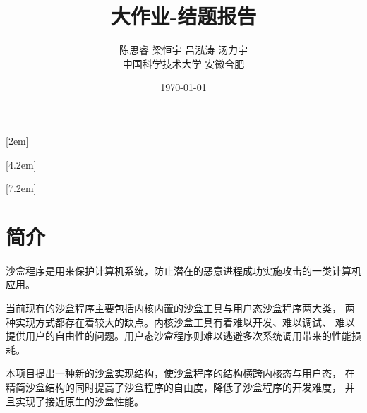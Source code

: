\documentclass[AutoFakeBold,a4paper]{ctexart}
\begin{document}
\title{\textbf{\Huge 大作业-结题报告}}

\author{陈思睿 \quad 梁恒宇 \quad 吕泓涛 \quad 汤力宇\\
中国科学技术大学 \quad 安徽合肥}

\date{\today}

\maketitle


[2em]{\addvspace{1.3mm}\bf}{%
\contentslabel{2.0em}}{}{\titlerule*[5pt]{$\cdot$}\contentspage}

[4.2em]{}{\contentslabel{2.5em}}{}{%
\titlerule*[5pt]{$\cdot$}\contentspage}

[7.2em]{}{\contentslabel{3.3em}}{}{%
\titlerule*[5pt]{$\cdot$}\contentspage}

\tableofcontents

\setcounter{page}{1}




\section{简介}
沙盒程序是用来保护计算机系统，防止潜在的恶意进程成功实施攻击的一类计算机应用。

当前现有的沙盒程序主要包括内核内置的沙盒工具与用户态沙盒程序两大类，
两种实现方式都存在着较大的缺点。内核沙盒工具有着难以开发、难以调试、
难以提供用户的自由性的问题。用户态沙盒程序则难以逃避多次系统调用带来的性能损耗。

本项目提出一种新的沙盒实现结构，使沙盒程序的结构横跨内核态与用户态，
在精简沙盒结构的同时提高了沙盒程序的自由度，降低了沙盒程序的开发难度，
并且实现了接近原生的沙盒性能。
\end{document}
